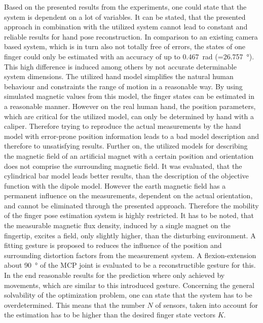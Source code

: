 Based on the presented results from the experiments, one could state that the system is dependent on a lot of variables. It can be stated, that the presented approach in combination with the utilized system cannot lead to constant and reliable results for hand pose reconstruction. In comparison to an existing camera based system, which is in turn also not totally free of errors, the states of one finger could only be estimated with an accuracy of up to \SI{0.467}{\radian} (=\SI{26.757}{\degree}). This high difference is induced among others by not accurate determinable system dimensions. The utilized hand model simplifies the natural human behaviour and constraints the range of motion in a reasonable way. By using simulated magnetic values from this model, the finger states can be estimated in a reasonable manner. However on the real human hand, the position parameters, which are critical for the utilized model, can only be determined by hand with a caliper. Therefore trying to reproduce the actual measurements by the hand model with error-prone position information leads to a bad model description and therefore to unsatisfying results. Further on, the utilized models for describing the magnetic field of an artificial magnet with a certain position and orientation does not comprise the surrounding magnetic field. It was evaluated, that the cylindrical bar model leads better results, than the description of the objective function with the dipole model. However the earth magnetic field has a permanent influence on the measurements, dependent on the actual orientation, and cannot be eliminated through the presented approach. Therefore the mobility of the finger pose estimation system is highly restricted. It has to be noted, that the measurable magnetic flux density, induced by a single magnet on the fingertip, excites a field, only slightly higher, than the disturbing environment. A fitting gesture is proposed to reduces the influence of the position and surrounding distortion factors from the measurement system. A flexion-extension about \SI{90}{\degree} of the \ac{MCP} joint is evaluated to be a reconstructible gesture for this. In the end reasonable results for the prediction where only achieved by movements, which are similar to this introduced gesture. Concerning the general solvability of the optimization problem, one can state that the system has to be overdetermined. This means that the number $ N $ of sensors, taken into account for the estimation has to be higher than the desired finger state vectors $ K $. 



